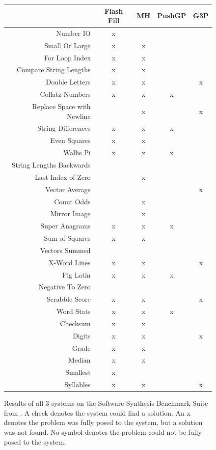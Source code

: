 \begin{figure}
\begin{tabular}{ r | c c c c }
	& Flash Fill & MH & PushGP & G3P \\
	\hline
	Number IO & x & \checkmark & \checkmark & \checkmark \\
	Small Or Large & x & x & \checkmark & \checkmark \\
	For Loop Index & x & x & \checkmark & \checkmark \\
	Compare String Lengths & x & x & \checkmark & \checkmark \\
	Double Letters & x & x & \checkmark & x \\
	Collatz Numbers & x & x & x \\
	Replace Space with Newline &   & x & \checkmark & x \\
	String Differences & x & x & x \\
	Even Squares & x & x & \checkmark & \checkmark \\
	Wallis Pi & x & x & x \\
	String Lengths Backwards &   & \checkmark  & \checkmark & \checkmark \\
	Last Index of Zero &  & x & \checkmark & \checkmark \\
	Vector Average &  & \checkmark & \checkmark & x \\
	Count Odds &  & x & \checkmark & \checkmark \\
	Mirror Image &  & x & \checkmark & \checkmark \\
	Super Anagrams & x & x & x & \checkmark \\
	Sum of Squares & x & x & \checkmark & \checkmark \\
	Vectors Summed &  & \checkmark & \checkmark & \checkmark \\
	X-Word Lines & x & x & \checkmark & x \\
	Pig Latin & x & x & x  \\
	Negative To Zero &  & \checkmark & \checkmark & \checkmark \\
	Scrabble Score & x & x & \checkmark & x \\
	Word Stats & x & x & x \\
	Checksum & x & x & \checkmark \\
	Digits & x & x & \checkmark & x \\
	Grade & x & x & \checkmark & \checkmark  \\
	Median & x & x & \checkmark & \checkmark \\
	Smallest & x & \checkmark & \checkmark & \checkmark \\
	Syllables & x & x & \checkmark & x \\
\end{tabular}
\caption{Results of all 3 systems on the Software Synthesis Benchmark Suite from \cite{Helmuth2015b}. A check denotes the system could find a solution. An x denotes the problem was fully posed to the system, but a solution was not found. No symbol denotes the problem could not be fully posed to the system.}
\label{fig:results2}
\end{figure}




